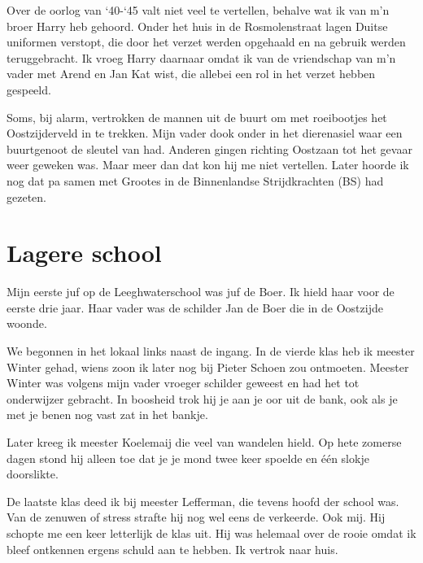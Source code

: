 \documentclass[12pt,twoside, openright]{memoir}
\begin{document}
Over de oorlog van `40-`45 valt niet veel te vertellen, behalve wat ik van m’n broer Harry heb gehoord. Onder het huis in de Rosmolenstraat lagen Duitse uniformen verstopt, die door het verzet werden opgehaald en na gebruik werden teruggebracht. Ik vroeg Harry daarnaar omdat ik van de vriendschap van m’n vader met Arend en Jan Kat wist, die allebei een rol in het verzet hebben gespeeld. 

Soms, bij alarm, vertrokken de mannen uit de buurt om met roeibootjes het Oostzijderveld in te trekken. Mijn vader dook onder in het dierenasiel waar een buurtgenoot de sleutel van had. Anderen gingen richting Oostzaan tot het gevaar weer geweken was. Maar meer dan dat kon hij me niet vertellen. Later hoorde ik nog dat pa samen met Grootes in de Binnenlandse Strijdkrachten (BS) had gezeten.

\section*{Lagere school} %
\label{cha:lagere_school}

Mijn eerste juf op de Leeghwaterschool was juf de Boer. Ik hield haar voor de eerste drie jaar. Haar vader was de schilder Jan de Boer die in de Oostzijde woonde. 

We begonnen in het lokaal links naast de ingang. In de vierde klas heb ik meester Winter gehad, wiens zoon ik later nog bij Pieter Schoen zou ontmoeten. Meester Winter was volgens mijn vader vroeger schilder geweest en had het tot onderwijzer gebracht. In boosheid trok hij je aan je oor uit de bank, ook als je met je benen nog vast zat in het bankje. 

Later kreeg ik meester Koelemaij die veel van wandelen hield. Op hete zomerse dagen stond hij alleen toe dat je je mond twee keer spoelde en één slokje doorslikte. 

De laatste klas deed ik bij meester Lefferman, die tevens hoofd der school was. Van de zenuwen of stress strafte hij nog wel eens de verkeerde. Ook mij. Hij schopte me een keer letterlijk de klas uit. Hij was helemaal over de rooie omdat ik bleef ontkennen ergens schuld aan te hebben. Ik vertrok naar huis. 
\end{document}
